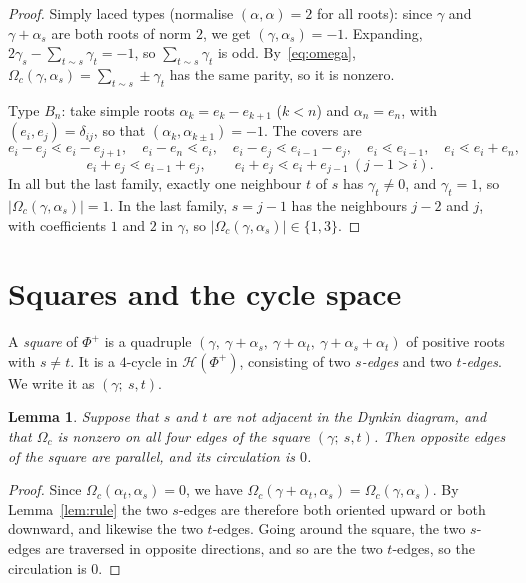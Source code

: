 \documentclass[11pt]{amsart}
\newtheorem{lemma}[theorem]{Lemma}
\theoremstyle{definition}
\newcommand{\Hasse}{\mathcal H}
\begin{document}
\begin{proof}
Simply laced types (normalise $(\alpha,\alpha)=2$ for all roots): since $\gamma$ and $\gamma+\alpha_s$ are both roots of norm $2$, we get $(\gamma,\alpha_s)=-1$. Expanding, $2\gamma_s-\sum_{t\sim s}\gamma_t=-1$, so $\sum_{t\sim s}\gamma_t$ is odd. By~\eqref{eq:omega}, $\Omega_c(\gamma,\alpha_s)=\sum_{t\sim s}\pm\gamma_t$ has the same parity, so it is nonzero.

Type $B_n$: take simple roots $\alpha_k=e_k-e_{k+1}$ ($k<n$) and $\alpha_n=e_n$, with $(e_i,e_j)=\delta_{ij}$, so that $(\alpha_k,\alpha_{k\pm1})=-1$. The covers are
\[e_i-e_j\lessdot e_i-e_{j+1},\quad e_i-e_n\lessdot e_i,\quad e_i-e_j\lessdot e_{i-1}-e_j,\quad e_i\lessdot e_{i-1},\quad e_i\lessdot e_i+e_n,\]
\[e_i+e_j\lessdot e_{i-1}+e_j,\qquad e_i+e_j\lessdot e_i+e_{j-1}\ (j-1>i).\]
In all but the last family, exactly one neighbour $t$ of $s$ has $\gamma_t\neq0$, and $\gamma_t=1$, so $|\Omega_c(\gamma,\alpha_s)|=1$. In the last family, $s=j-1$ has the neighbours $j-2$ and $j$, with coefficients $1$ and $2$ in $\gamma$, so $|\Omega_c(\gamma,\alpha_s)|\in\{1,3\}$.
\end{proof}

\section{Squares and the cycle space}\label{sec:squares}
A \emph{square} of $\Phi^+$ is a quadruple $(\gamma,\ \gamma+\alpha_s,\ \gamma+\alpha_t,\ \gamma+\alpha_s+\alpha_t)$ of positive roots with $s\neq t$. It is a $4$-cycle in $\Hasse(\Phi^+)$, consisting of two \emph{$s$-edges} and two \emph{$t$-edges}. We write it as $(\gamma;\ s,t)$.

\begin{lemma}\label{lem:square}
Suppose that $s$ and $t$ are not adjacent in the Dynkin diagram, and that $\Omega_c$ is nonzero on all four edges of the square $(\gamma;\ s,t)$. Then opposite edges of the square are parallel, and its circulation is $0$.
\end{lemma}

\begin{proof}
Since $\Omega_c(\alpha_t,\alpha_s)=0$, we have $\Omega_c(\gamma+\alpha_t,\alpha_s)=\Omega_c(\gamma,\alpha_s)$. By Lemma~\ref{lem:rule} the two $s$-edges are therefore both oriented upward or both downward, and likewise the two $t$-edges. Going around the square, the two $s$-edges are traversed in opposite directions, and so are the two $t$-edges, so the circulation is $0$.
\end{proof}
\end{document}
